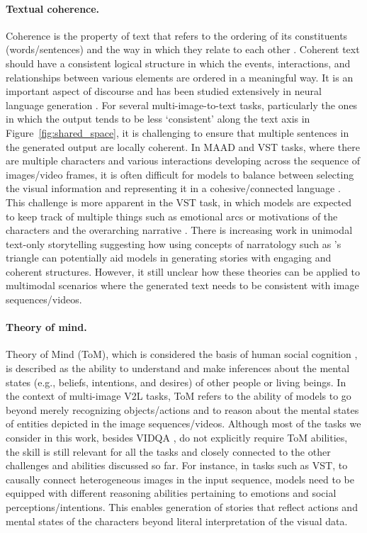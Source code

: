 \paragraph{Textual coherence.}
Coherence is the property of text that refers to the ordering of its constituents (words/sentences) and the way in which they relate to each other \cite{coh1}. Coherent text should have a consistent logical structure in which the events, interactions, and relationships between various elements are ordered in a meaningful way. It is an important aspect of discourse and has been studied extensively in neural language generation \cite{coh2}. For several multi-image-to-text tasks, particularly the ones in which the output tends to be less `consistent' along the text axis in Figure~\ref{fig:shared_space}, it is challenging to ensure that multiple sentences in the generated output are locally coherent. In \color{xkcdVividBlue}MAAD \color{black}and \color{xkcdVividBlue}VST \color{black} tasks, where there are multiple characters and various interactions developing across the sequence of images/video frames, it is often difficult for models to balance between selecting the visual information and representing it in a cohesive/connected language \cite{coh3}. This challenge is more apparent in the \color{xkcdVividBlue}VST \color{black} task, in which models are expected to keep track of multiple things such as emotional arcs or motivations of the characters and the overarching narrative \cite{nytws}. There is increasing work in unimodal text-only storytelling suggesting how using concepts of narratology \cite{narrativity1,narrativity2} such as \citet{narrativity_genette}'s triangle can potentially aid models in generating stories with engaging and coherent structures. However, it still unclear how these theories can be applied to multimodal scenarios where the generated text needs to be consistent with image sequences/videos.

\paragraph{Theory of mind.}
Theory of Mind (ToM), which is considered the basis of human social cognition \cite{tom1}, is described as the ability to understand and make inferences about the mental states (e.g., beliefs, intentions, and desires) of other people or living beings. In the context of multi-image V2L tasks, ToM refers to the ability of models to go beyond merely recognizing objects/actions and to reason about the mental states of entities depicted in the image sequences/videos. Although most of the tasks we consider in this work, besides \color{xkcdVividBlue}VIDQA \color{black} \cite{videoqa_bdiqa}, do not explicitly require ToM abilities, the skill is still relevant for all the tasks and closely connected to the other challenges and abilities discussed so far. For instance, in tasks such as \color{xkcdVividBlue}VST\color{black}, to causally connect heterogeneous images in the input sequence, models need to be equipped with different reasoning abilities pertaining to emotions and social perceptions/intentions. This enables generation of stories that reflect actions and mental states of the characters beyond literal interpretation of the visual data.

